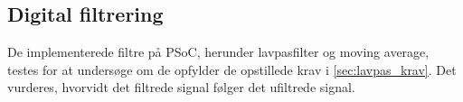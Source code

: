 \subsection{Digital filtrering}
De implementerede filtre på PSoC, herunder lavpasfilter og moving average, testes for at undersøge om de opfylder de opstillede krav i \autoref{sec:lavpas_krav}. 
Det vurderes, hvorvidt det filtrede signal følger det ufiltrede signal. 